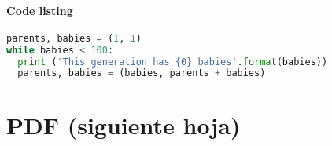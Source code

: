 \documentclass[12pt, twoside, openright]{report} %
\begin{document}
\subsection{Code listing}
\begin{lstlisting}[language=Python]
parents, babies = (1, 1)
while babies < 100:
  print ('This generation has {0} babies'.format(babies))
  parents, babies = (babies, parents + babies)
\end{lstlisting}

\part{PDF (siguiente hoja)}

\end{document}
